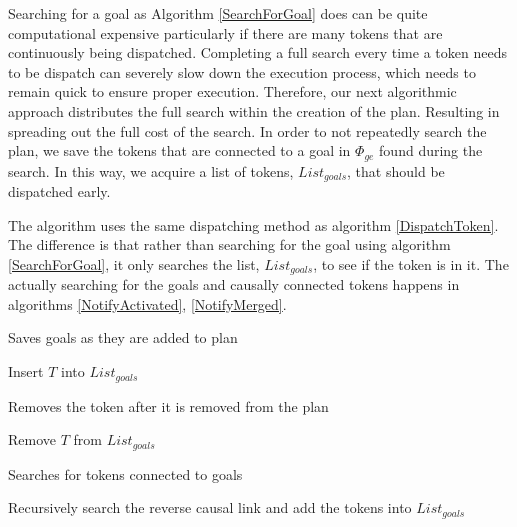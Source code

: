 Searching for a goal as Algorithm \ref{SearchForGoal} does can be
quite computational expensive particularly if there are many tokens
that are continuously being dispatched. Completing a full search every
time a token needs to be dispatch can severely slow down the execution
process, which needs to remain quick to ensure proper
execution. Therefore, our next algorithmic approach distributes the
full search within the creation of the plan.  Resulting in spreading out the full cost of the
search. In order to not repeatedly search the plan, we save the tokens
that are connected to a goal in $\Phi_{ge}$ found during the
search. In this way, we acquire a list of tokens, $List_{goals}$, that should be
dispatched early.

The algorithm uses the same dispatching method as algorithm \ref{DispatchToken}.
The difference is that rather than searching for the goal using algorithm \ref{SearchForGoal}, 
it only searches the list, $List_{goals}$, to see if the token is in it. The actually searching for the goals and causally 
connected tokens happens in algorithms \ref{NotifyActivated}, \ref{NotifyMerged}. 

\begin{algorithm}
\caption{Saves goals as they are added to plan}
\label{NotifyAdded}
\begin{algorithmic}
	\State Insert $T$ into $List_{goals}$
\EndIf 
\EndFunction
\end{algorithmic}
\end{algorithm}

\begin{algorithm}
\caption{Removes the token after it is removed from the plan}
\label{NotifyRemoved}
\begin{algorithmic}
	\State Remove $T$ from $List_{goals}$
\EndFunction
\end{algorithmic}
\end{algorithm}

\begin{algorithm}
\caption{Searches for tokens connected to goals}
\label{NotifyActivated}
\begin{algorithmic}
	\State Recursively search the reverse causal link and add the tokens into $List_{goals}$
\EndIf
\EndFunction
\end{algorithmic}
\end{algorithm}

